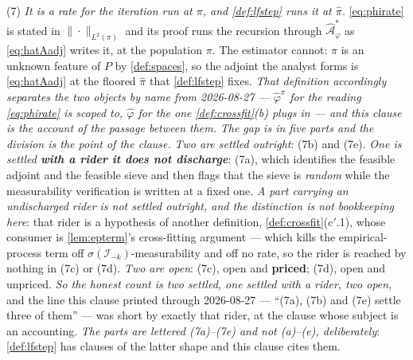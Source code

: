 \begin{remark}
(7) \emph{It is a rate for the iteration run at $\pi$, and \cref{def:lfstep} runs it at $\hat\pi$.}
\eqref{eq:phirate} is stated in $\|\cdot\|_{L^{2}(\pi)}$ and its proof runs the recursion through
$\hat{\mathcal A}^\ast_\varphi$ as \eqref{eq:hatAadj} writes it, at the population $\pi$. The estimator
cannot: $\pi$ is an unknown feature of $P$ by \cref{def:spaces}, so the adjoint the analyst forms is
\eqref{eq:hatAadj} at the floored $\hat\pi$ that \cref{def:lfstep} fixes. \emph{That definition
accordingly separates the two objects by name from 2026-08-27 --- $\hat\varphi^{\pi}$ for the reading
\eqref{eq:phirate} is scoped to, $\hat\varphi$ for the one \cref{def:crossfit}\textup{(b)} plugs in ---
and this clause is the account of the passage between them.}
\emph{The gap is in five parts
and the division is the point of the clause.} \emph{Two are settled outright}: \textup{(7b)} and
\textup{(7e)}. \emph{One is settled \textbf{with a rider it does not discharge}}: \textup{(7a)}, which
identifies the feasible adjoint and the feasible sieve and then flags that the sieve is \emph{random}
while the measurability verification is written at a fixed one. \emph{A part carrying an undischarged
rider is not settled outright, and the distinction is not bookkeeping here}: that rider is a hypothesis
of another definition, \cref{def:crossfit}\textup{(c$'$.1)}, whose consumer is
\cref{lem:epterm}'s cross-fitting argument --- which kills the empirical-process term off
$\sigma(\mathcal I_{-k})$-measurability and off no rate, so the rider is reached by nothing in
\textup{(7c)} or \textup{(7d)}. \emph{Two are open}: \textup{(7c)}, open and \textbf{priced};
\textup{(7d)}, open and unpriced. \emph{So the honest count is two settled, one settled with a rider,
two open}, and the line this clause printed through 2026-08-27 --- ``\textup{(7a)}, \textup{(7b)} and
\textup{(7e)} settle three of them'' --- was short by exactly that rider, at the clause whose subject is
an accounting. \emph{The parts are
lettered \textup{(7a)}--\textup{(7e)} and not \textup{(a)}--\textup{(e)}, deliberately}:
\cref{def:lfstep} has clauses of the latter shape and this clause cites them.

\end{remark}
